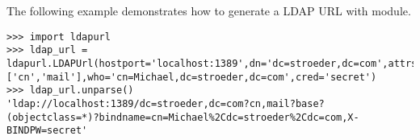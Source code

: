 The following example demonstrates how to generate a LDAP URL
with  module.

\begin{verbatim}
>>> import ldapurl
>>> ldap_url = ldapurl.LDAPUrl(hostport='localhost:1389',dn='dc=stroeder,dc=com',attrs=['cn','mail'],who='cn=Michael,dc=stroeder,dc=com',cred='secret')
>>> ldap_url.unparse()
'ldap://localhost:1389/dc=stroeder,dc=com?cn,mail?base?(objectclass=*)?bindname=cn=Michael%2Cdc=stroeder%2Cdc=com,X-BINDPW=secret'
\end{verbatim}
